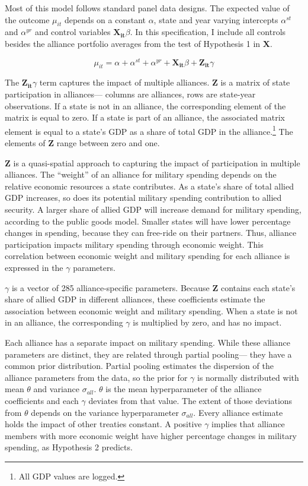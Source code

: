 \documentclass[12pt]{article}
\begin{document}
Most of this model follows standard panel data designs.
The expected value of the outcome $\mu_{it}$ depends on a constant $\alpha$, state and year varying intercepts $\alpha^{st}$ and $\alpha^{yr}$ and control variables $\mathbf{X_{it}} \beta$. 
In this specification, I include all controls besides the alliance portfolio averages from the test of Hypothesis 1 in $\mathbf{X}$.


\begin{equation}
\mu_{it} = \alpha + \alpha^{st} + \alpha^{yr} + \mathbf{X_{it}} \beta + \mathbf{Z_{it}} \gamma 
\end{equation}


The $\mathbf{Z_{it}} \gamma$ term captures the impact of multiple alliances. 
\textbf{Z} is a matrix of state participation in alliances--- columns are alliances, rows are state-year observations. 
If a state is not in an alliance, the corresponding element of the matrix is equal to zero. 
If a state is part of an alliance, the associated matrix element is equal to a state's GDP as a share of total GDP in the alliance.\footnote{All GDP values are logged.} 
The elements of \textbf{Z} range between zero and one. 


\textbf{Z} is a quasi-spatial approach to capturing the impact of participation in multiple alliances.
The ``weight'' of an alliance for military spending depends on the relative economic resources a state contributes.  
As a state's share of total allied GDP increases, so does its potential military spending contribution to allied security.  
A larger share of allied GDP will increase demand for military spending, according to the public goods model. 
Smaller states will have lower percentage changes in spending, because they can free-ride on their partners.
Thus, alliance participation impacts military spending through economic weight. 
This correlation between economic weight and military spending for each alliance is expressed in the $\gamma$ parameters. 


$\gamma$ is a vector of 285 alliance-specific parameters.  
Because \textbf{Z} contains each state's share of allied GDP in different alliances, these coefficients estimate the association between economic weight and military spending. 
When a state is not in an alliance, the corresponding $\gamma$ is multiplied by zero, and has no impact. 


Each alliance has a separate impact on military spending.
While these alliance parameters are distinct, they are related through partial pooling--- they have a common prior distribution.
Partial pooling estimates the dispersion of the alliance parameters from the data, so the prior for $\gamma$ is normally distributed with mean $\theta$ and variance $\sigma_{all}$. 
$\theta$ is the mean hyperparameter of the alliance coefficients and each $\gamma$ deviates from that value.
The extent of those deviations from $\theta$ depends on the variance hyperparameter $\sigma_{all}$.
Every alliance estimate holds the impact of other treaties constant. 
A positive $\gamma$ implies that alliance members with more economic weight have higher percentage changes in military spending, as Hypothesis 2 predicts. 
    
\end{document}
